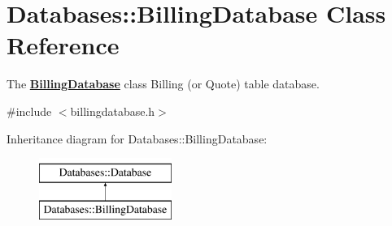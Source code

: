 \hypertarget{classDatabases_1_1BillingDatabase}{\section{Databases\-:\-:Billing\-Database Class Reference}
\label{classDatabases_1_1BillingDatabase}
}


The {\bfseries \hyperlink{classDatabases_1_1BillingDatabase}{Billing\-Database}} class Billing (or Quote) table database.  




{\ttfamily \#include $<$billingdatabase.\-h$>$}

Inheritance diagram for Databases\-:\-:Billing\-Database\-:\begin{figure}[H]
\begin{center}
\leavevmode
\includegraphics[height=2.000000cm]{df/df8/classDatabases_1_1BillingDatabase}
\end{center}
\end{figure}
